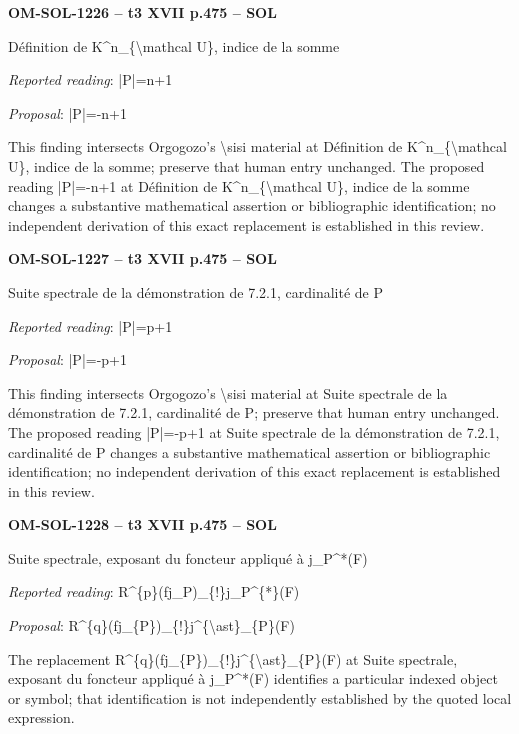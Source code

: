 \par\noindent\textbf{OM-SOL-1226 -- t3 XVII p.475 -- SOL}\par
Définition de K\textasciicircum{}n\_\{\textbackslash{}mathcal U\}, indice de la somme\par
\emph{Reported reading}: |P|=\allowbreak n+1\par
\emph{Proposal}: |P|=\allowbreak -n+1\par
This finding intersects Orgogozo's \textbackslash{}sisi material at Définition de K\textasciicircum{}n\_\{\textbackslash{}mathcal U\}, indice de la somme; preserve that human entry unchanged. The proposed reading |P|=\allowbreak -n+1 at Définition de K\textasciicircum{}n\_\{\textbackslash{}mathcal U\}, indice de la somme changes a substantive mathematical assertion or bibliographic identification; no independent derivation of this exact replacement is established in this review.\par
\par\noindent\textbf{OM-SOL-1227 -- t3 XVII p.475 -- SOL}\par
Suite spectrale de la démonstration de 7.2.1, cardinalité de P\par
\emph{Reported reading}: |P|=\allowbreak p+1\par
\emph{Proposal}: |P|=\allowbreak -p+1\par
This finding intersects Orgogozo's \textbackslash{}sisi material at Suite spectrale de la démonstration de 7.2.1, cardinalité de P; preserve that human entry unchanged. The proposed reading |P|=\allowbreak -p+1 at Suite spectrale de la démonstration de 7.2.1, cardinalité de P changes a substantive mathematical assertion or bibliographic identification; no independent derivation of this exact replacement is established in this review.\par
\par\noindent\textbf{OM-SOL-1228 -- t3 XVII p.475 -- SOL}\par
Suite spectrale, exposant du foncteur appliqué à j\_P\textasciicircum{}*(F)\par
\emph{Reported reading}: R\textasciicircum{}\{p\}(fj\_P)\_\{!\}j\_P\textasciicircum{}\{*\}(F)\par
\emph{Proposal}: R\textasciicircum{}\{q\}(fj\_\{P\})\_\{!\}j\textasciicircum{}\{\textbackslash{}ast\}\_\{P\}(F)\par
The replacement R\textasciicircum{}\{q\}(fj\_\{P\})\_\{!\}j\textasciicircum{}\{\textbackslash{}ast\}\_\{P\}(F) at Suite spectrale, exposant du foncteur appliqué à j\_P\textasciicircum{}*(F) identifies a particular indexed object or symbol; that identification is not independently established by the quoted local expression.\par
